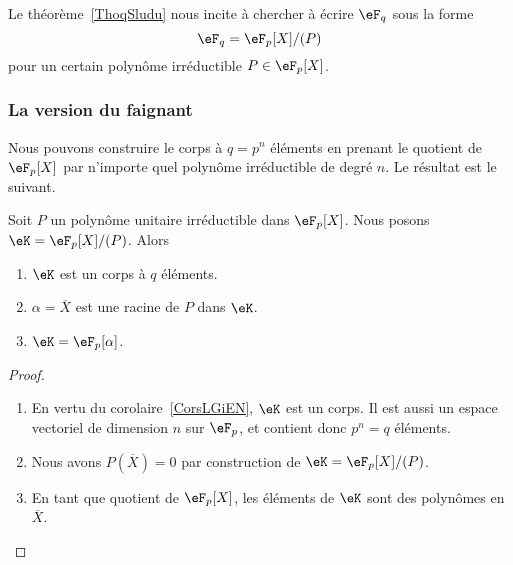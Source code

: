 Le théorème~\ref{ThoqSludu} nous incite à chercher à écrire \( \eF_q\) sous la forme
\begin{equation}
	\eF_q=\eF_p[X]/(P)
\end{equation}
pour un certain polynôme irréductible \( P\in\eF_p[X]\).

\subsubsection{La version du faignant}

Nous pouvons construire le corps à \( q=p^n\) éléments en prenant le quotient de \( \eF_p[X]\) par n'importe quel polynôme irréductible de degré \( n\). Le résultat est le suivant.
\begin{proposition} \label{PropHfrNCB}
	Soit \( P\) un polynôme unitaire irréductible dans \( \eF_p[X]\). Nous posons \( \eK=\eF_p[X]/(P)\). Alors
	\begin{enumerate}
		\item
		      \( \eK\) est un corps à \( q\) éléments.
		\item
		      \( \alpha=\overline X\) est une racine de \( P\) dans \( \eK\).
		\item   \label{ItemiEFRTg}
		      \( \eK=\eF_p[\alpha]\).
	\end{enumerate}
\end{proposition}

\begin{proof}
	\begin{enumerate}
		\item
		      En vertu du corolaire~\ref{CorsLGiEN}, \( \eK\) est un corps. Il est aussi un espace vectoriel de dimension \( n\) sur \( \eF_p\), et contient donc \( p^n=q\) éléments.
		\item
		      Nous avons \( P(\overline X)=0\) par construction de \( \eK=\eF_p[X]/(P)\).
		\item
		      En tant que quotient de \( \eF_p[X]\), les éléments de \( \eK\) sont des polynômes en \( \overline X\).
	\end{enumerate}
\end{proof}

